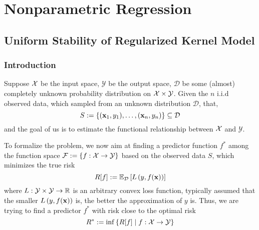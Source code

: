 \chapter{Nonparametric Regression}

\section{Uniform Stability of Regularized Kernel Model}

\subsection{Introduction}

Suppose ${\mathcal X}$ be the input space, $\mathcal{Y}$ be the output space, $\mathcal{D}$ be some (almost) completely unknown probability distribution on ${\mathcal X}\times\mathcal{Y}$. Given the $n$ i.i.d observed data, which sampled from an unknown distribution $\mathcal{D}$, that,
\begin{equation}
	S:=\left\{({\bf x}_{1},y_{1}),\ldots,({\bf x}_{n},y_{n})\right\}\subseteq\mathcal{D}
\end{equation}
and the goal of us is to estimate the functional relationship between ${\mathcal X}$ and $\mathcal{Y}$.

To formalize the problem, we now aim at finding a predictor function $f^{*}$ among the function space ${\mathcal F}:=\left\{f:{\mathcal X}\rightarrow\mathcal{Y}\right\}$ based on the observed data $S$, which minimizes the true risk
\begin{equation} \label{eq:true-risk}
	R[f]:={\mathbb E}_{\mathcal{D}}\left[L\left(y,f({\bf x})\right)\right]
\end{equation}
where $L:\mathcal{Y}\times\mathcal{Y}\rightarrow{\mathbb R}$ is an arbitrary convex loss function, typically assumed that the smaller $L\left(y,f({\bf x})\right)$ is, the better the approximation of $y$ is. Thus, we are trying to find a predictor $f^{*}$ with risk close to the optimal risk
\begin{equation}
	R^{*}:=\inf\left\{R[f]\mid f:{\mathcal X}\rightarrow\mathcal{Y}\right\}
\end{equation}


